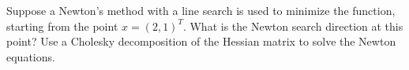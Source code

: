 Suppose a Newton's method with a line search is used to minimize the function, starting from the point $x = (2, 1)^T$.
What is the Newton search direction at this point? Use a Cholesky decomposition of the Hessian matrix to solve the
Newton equations.

\begin{solution}
    \ \\
    \vfill
\end{solution}
